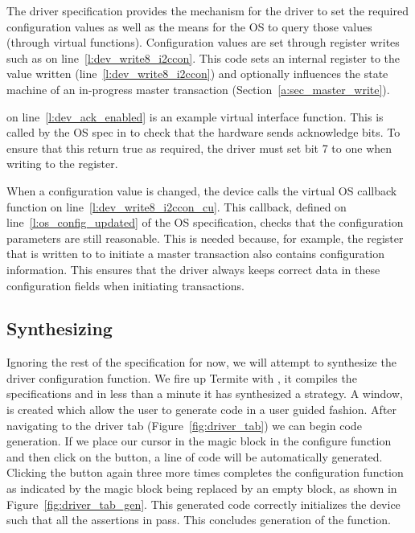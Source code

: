 The driver specification provides the mechanism for the driver to set the required configuration values as well as the means for the OS to query those values (through virtual functions). Configuration values are set through register writes such as  on line~\ref{l:dev_write8_i2ccon}. This code sets an internal register to the value written (line~\ref{l:dev_write8_i2ccon}) and optionally influences the state machine of an in-progress master transaction (Section~\ref{a:sec_master_write}). 

 on line~\ref{l:dev_ack_enabled} is an example virtual interface function. This is called by the OS spec in  to check that the hardware sends acknowledge bits. To ensure that this return true as required, the driver must set bit 7 to one when writing to the  register.

When a configuration value is changed, the device calls the virtual OS callback function  on line~\ref{l:dev_write8_i2ccon_cu}. This callback, defined on line~\ref{l:os_config_updated} of the OS specification, checks that the configuration parameters are still reasonable. This is needed because, for example, the register that is written to to initiate a master transaction also contains configuration information. This ensures that the driver always keeps correct data in these configuration fields when initiating transactions.

\subsection{Synthesizing}
Ignoring the rest of the specification for now, we will attempt to synthesize the driver configuration function. We fire up Termite with , it compiles the specifications and in less than a minute it has synthesized a strategy. A window, is created which allow the user to generate code in a user guided fashion. After navigating to the driver tab (Figure~\ref{fig:driver_tab}) we can begin code generation. If we place our cursor in the magic block in the configure function and then click on the  button, a line of code will be automatically generated. Clicking the  button again three more times completes the configuration function as indicated by the magic block being replaced by an empty block, as shown in Figure~\ref{fig:driver_tab_gen}. This generated code correctly initializes the device such that all the assertions in  pass. This concludes generation of the  function.

